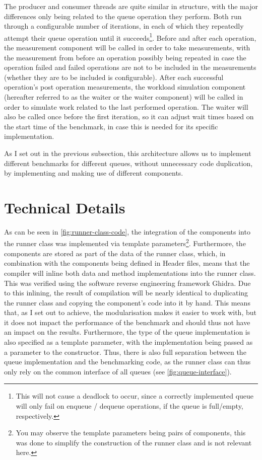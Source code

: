 The producer and consumer threads are quite similar in structure, with the major differences only being
related to the queue operation they perform.
Both run through a configurable number of iterations, in each of which they repeatedly attempt their queue operation
until it succeeds\footnote{This will not cause a deadlock to occur, since a correctly implemented queue will
only fail on enqueue / dequeue operations, if the queue is full/empty, respectively.}.
Before and after each operation, the measurement component will be called in order to take measurements, with
the measurement from before an operation possibly being repeated in case the operation failed and failed
operations are not to be included in the measurements (whether they are to be included is configurable).
After each successful operation's post operation measurements, the workload simulation component (hereafter
referred to as the waiter or the waiter component) will be called in order to simulate work related
to the last performed operation.
The waiter will also be called once before the first iteration, so it can adjust wait times based on the
start time of the benchmark, in case this is needed for its specific implementation.

As I set out in the previous subsection, this architecture allows us to implement different benchmarks for
different queues, without unnecessary code duplication, by implementing and making use of different components.

\section{Technical Details}
\label{sec:framework-technical-details}



As can be seen in \autoref{fig:runner-class-code}, the integration of the components into the runner class
was implemented via template parameters\footnote{You may observe the template parameters being pairs of
components, this was done to simplify the construction of the runner class and is not relevant here.}.
Furthermore, the components are stored as part of the data of the runner class, which, in combination with the
components being defined in Header files, means that the compiler will inline both data and method
implementations into the runner class.
This was verified using the software reverse engineering framework Ghidra.
Due to this inlining, the result of compilation will be nearly identical to duplicating the runner class and
copying the component's code into it by hand.
This means that, as I set out to achieve, the modularisation makes it easier to work with, but it does not
impact the performance of the benchmark and should thus not have an impact on the results.
Furthermore, the type of the queue implementation is also specified as a template parameter, with the
implementation being passed as a parameter to the constructor.
Thus, there is also full separation between the queue implementation and the benchmarking code, as the runner
class can thus only rely on the common interface of all queues (see \autoref{fig:queue-interface}).

